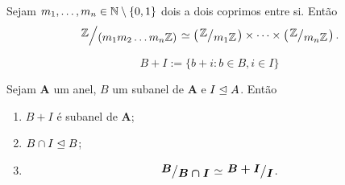 \begin{prop}
	Sejam $m_1,\ldots,m_n \in \mathbb{N}\setminus\{0,1\}$ dois a dois coprimos entre si. Então
	\begin{equation*}
	\quo{\Z}{\left(m_1m_2\ldots m_n\Z\right)} \simeq \left(\quo{\Z}{m_1\Z}\right) \times \cdots \times \left(\quo{\Z}{m_n\Z}\right).
	\end{equation*}
\end{prop}

\begin{defi}
	\begin{equation*}
	B+I := \{b+i : b \in B, i \in I\}
	\end{equation*}
\end{defi}

\begin{teo}
	Sejam $\bm A$ um anel, $B$ um subanel de $\bm A$ e $I \mathrel{\unlhd} A$. Então
	\begin{enumerate}
	\item $B+I$ é subanel de $\bm A$;
	\item $B \cap I \mathrel{\unlhd} B$;
	\item
	\begin{equation*}
	\bm{\quo{B}{B \cap I}} \simeq \bm{\quo{B+I}{I}}.
	\end{equation*}
	\end{enumerate}
\end{teo}
